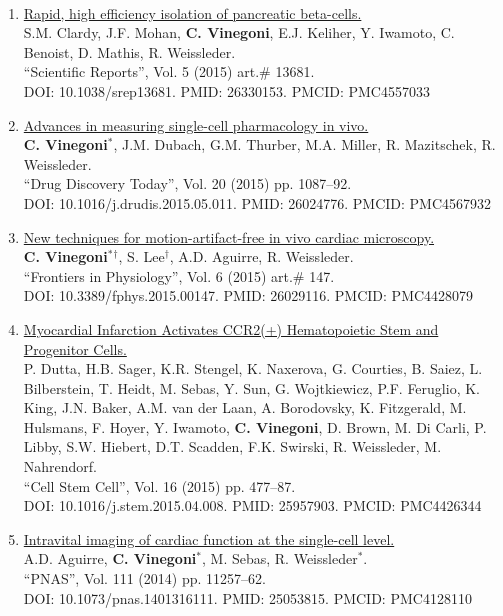 \documentclass{resume}
\begin{document}
\begin{category}{~~}
\begin{enumerate}
\item
\href{https://tinyurl.com/nufk6x9h}{Rapid, high efficiency isolation of pancreatic beta-cells.}\\
S.M. Clardy, J.F. Mohan, {\bf C. Vinegoni}, E.J. Keliher, Y. Iwamoto, C. Benoist, D. Mathis, R. Weissleder.\\
 ``Scientific Reports'', Vol. 5 (2015) art.$\#$ 13681. \\DOI: 10.1038/srep13681. PMID: 26330153. PMCID: PMC4557033

\item
\href{https://tinyurl.com/27kj77xh}{Advances in measuring single-cell pharmacology in vivo.}\\
 {\bf C. Vinegoni$^*$}, J.M. Dubach, G.M. Thurber, M.A. Miller, R. Mazitschek, R. Weissleder.\\
 ``Drug Discovery Today'', Vol. 20 (2015) pp. 1087--92. \\DOI: 10.1016/j.drudis.2015.05.011. PMID: 26024776. PMCID: PMC4567932

\item
\href{https://tinyurl.com/9mw5etwc}{New techniques for motion-artifact-free in vivo cardiac microscopy.}\\
 {\bf C. Vinegoni$^*${$^\dag$}}, S. Lee{$^\dag$}, A.D. Aguirre, R. Weissleder. \\
 ``Frontiers in Physiology'', Vol. 6 (2015) art.$\#$ 147. \\DOI: 10.3389/fphys.2015.00147. PMID: 26029116. PMCID: PMC4428079

\item
\href{https://tinyurl.com/3kzjb3a6}{Myocardial Infarction Activates CCR2(+) Hematopoietic Stem and Progenitor Cells.}\\
P. Dutta, H.B. Sager, K.R. Stengel, K. Naxerova, G. Courties, B. Saiez, L. Bilberstein, T. Heidt, M. Sebas, Y. Sun, G. Wojtkiewicz, P.F. Feruglio, K. King, J.N. Baker, A.M. van der Laan, A. Borodovsky, K. Fitzgerald, M. Hulsmans, F. Hoyer, Y. Iwamoto, {\bf C. Vinegoni}, D. Brown, M. Di Carli, P. Libby, S.W. Hiebert, D.T. Scadden, F.K. Swirski, R. Weissleder, M. Nahrendorf.\\
 ``Cell Stem Cell'', Vol. 16 (2015) pp. 477--87. \\DOI: 10.1016/j.stem.2015.04.008. PMID: 25957903. PMCID: PMC4426344

\item
\href{https://tinyurl.com/vf68d5zj}{ Intravital imaging of cardiac function at the single-cell level.}\\
A.D. Aguirre,  {\bf C. Vinegoni$^*$}, M. Sebas, R. Weissleder$^*$. \\
 ``PNAS'', Vol. 111 (2014) pp. 11257--62. \\DOI: 10.1073/pnas.1401316111. PMID: 25053815. PMCID: PMC4128110


\end{enumerate}
\end{category}
\end{document}
